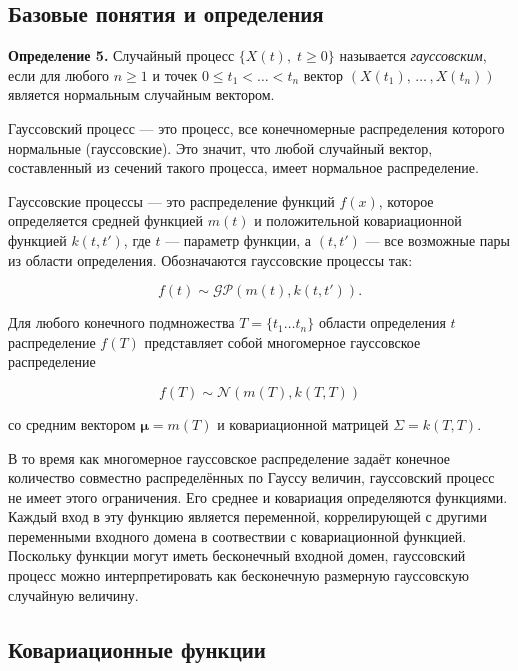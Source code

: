 \documentclass[11pt,a4paper]{article}
\begin{document}
\hypertarget{ux431ux430ux437ux43eux432ux44bux435-ux43fux43eux43dux44fux442ux438ux44f-ux438-ux43eux43fux440ux435ux434ux435ux43bux435ux43dux438ux44f}{%
\subsection{Базовые понятия и
определения}\label{ux431ux430ux437ux43eux432ux44bux435-ux43fux43eux43dux44fux442ux438ux44f-ux438-ux43eux43fux440ux435ux434ux435ux43bux435ux43dux438ux44f}}

\textbf{Определение 5.} Случайный процесс \(\{X(t), \; t \ge 0\}\)
называется \emph{гауссовским}, если для любого \(n \ge 1\) и точек
\(0 \le t_1 < \ldots < t_n\) вектор \((X(t_1), \, \ldots \,, X(t_n))\)
является нормальным случайным вектором.

Гауссовский процесс --- это процесс, все конечномерные распределения
которого нормальные (гауссовские). Это значит, что любой случайный
вектор, составленный из сечений такого процесса, имеет нормальное
распределение.

Гауссовские процессы --- это распределение функций \(f(x)\), которое
определяется средней функцией \(m(t)\) и положительной ковариационной
функцией \(k(t,t')\), где \(t\) --- параметр функции, а \((t,t')\) ---
все возможные пары из области определения. Обозначаются гауссовские
процессы так:

\[ f(t) \sim \mathcal{GP}(m(t), k(t,t')). \]

Для любого конечного подмножества \(T=\{{t}_1 \ldots {t}_n \}\) области
определения \(t\) распределение \(f(T)\) представляет собой многомерное
гауссовское распределение

\[ f(T) \sim \mathcal{N}(m(T), k(T, T)) \]

со средним вектором \(\mathbf{\mu} = m(T)\) и ковариационной матрицей
\(\Sigma = k(T, T)\).

В то время как многомерное гауссовское распределение задаёт конечное
количество совместно распределённых по Гауссу величин, гауссовский
процесс не имеет этого ограничения. Его среднее и ковариация
определяются функциями. Каждый вход в эту функцию является переменной,
коррелирующей с другими переменными входного домена в соотвествии с
ковариационной функцией. Поскольку функции могут иметь бесконечный
входной домен, гауссовский процесс можно интерпретировать как
бесконечную размерную гауссовскую случайную величину.

    \hypertarget{ux43aux43eux432ux430ux440ux438ux430ux446ux438ux43eux43dux43dux44bux435-ux444ux443ux43dux43aux446ux438ux438}{%
\subsection{Ковариационные
функции}\label{ux43aux43eux432ux430ux440ux438ux430ux446ux438ux43eux43dux43dux44bux435-ux444ux443ux43dux43aux446ux438ux438}}
\end{document}
